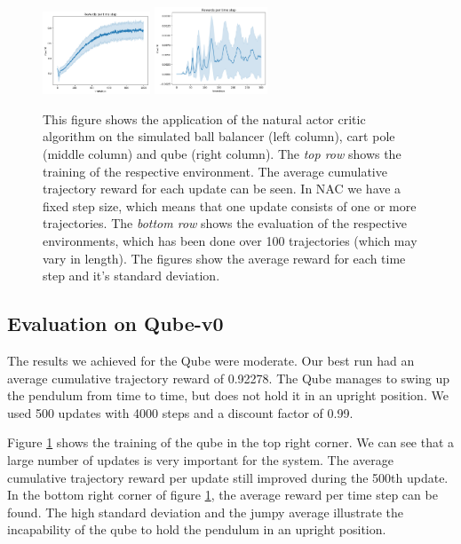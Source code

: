 \begin{figure}
\begin{center}
		\hspace{4mm}
		\includegraphics[width=0.285\textwidth]{plots/NAC_BBtime_step_reward.png}
		\hspace{1mm}
		\includegraphics[width=0.3\textwidth]{plots/NAC_Qube_time_step_reward.png}
		\hspace{1.5mm}
		\caption{This figure shows the application of the natural actor critic algorithm on the simulated ball balancer (left column), cart pole (middle column) and qube (right column). The \textit{top row} shows the training of the respective environment. The average cumulative trajectory reward for each update can be seen. In NAC we have a fixed step size, which means that one update consists of one or more trajectories. The\textit{ bottom row} shows the evaluation of the respective environments, which has been done over 100 trajectories (which may vary in length). The figures show the average reward for each time step and it's standard deviation.}
		\label{fig:nac}
	\end{center}
\end{figure}

\subsection{Evaluation on Qube-v0}

The results we achieved for the Qube were moderate. Our best run had an average cumulative trajectory reward of 0.92278. The Qube manages to swing up the pendulum from time to time, but does not hold it in an upright position. We used 500 updates with 4000 steps and a discount factor of 0.99. 

Figure \ref{fig:nac} shows the training of the qube in the top right corner. We can see that a large number of updates is very important for the system. The average cumulative trajectory reward per update still improved during the 500th update. In the bottom right corner of figure \ref{fig:nac}, the average reward per time step can be found. The high standard deviation and the jumpy average illustrate the incapability of the qube to hold the pendulum in an upright position.

